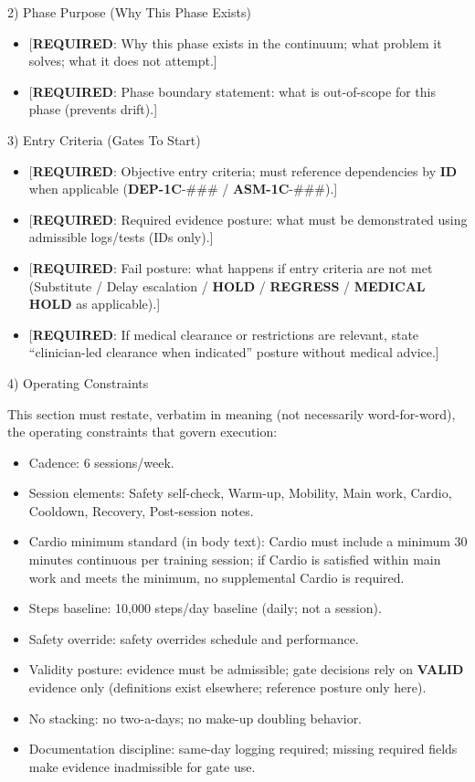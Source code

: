 \documentclass[10pt]{article}
\begin{document}
2) Phase Purpose (Why This Phase Exists)

\begin{itemize}
\item {[\textbf{REQUIRED}: Why this phase exists in the continuum; what problem it solves; what it does not attempt.]}
\item {[\textbf{REQUIRED}: Phase boundary statement: what is out-of-scope for this phase (prevents drift).]}
\end{itemize}

3) Entry Criteria (Gates To Start)

\begin{itemize}
\item {[\textbf{REQUIRED}: Objective entry criteria; must reference dependencies by \textbf{ID} when applicable (\textbf{DEP-1C}-\#\#\# / \textbf{ASM-1C}-\#\#\#).]}
\item {[\textbf{REQUIRED}: Required evidence posture: what must be demonstrated using admissible logs/tests (IDs only).]}
\item {[\textbf{REQUIRED}: Fail posture: what happens if entry criteria are not met (Substitute / Delay escalation / \textbf{HOLD} / \textbf{REGRESS} / \textbf{MEDICAL} \textbf{HOLD} as applicable).]}
\item {[\textbf{REQUIRED}: If medical clearance or restrictions are relevant, state “clinician-led clearance when indicated” posture without medical advice.]}
\end{itemize}

4) Operating Constraints

This section must restate, verbatim in meaning (not necessarily word-for-word), the operating constraints that govern execution:

\begin{itemize}
\item Cadence: 6 sessions/week.
\item Session elements: Safety self-check, Warm-up, Mobility, Main work, Cardio, Cooldown, Recovery, Post-session notes.
\item Cardio minimum standard (in body text): Cardio must include a minimum 30 minutes continuous per training session; if Cardio is satisfied within main work and meets the minimum, no supplemental Cardio is required.
\item Steps baseline: 10,000 steps/day baseline (daily; not a session).
\item Safety override: safety overrides schedule and performance.
\item Validity posture: evidence must be admissible; gate decisions rely on \textbf{VALID} evidence only (definitions exist elsewhere; reference posture only here).
\item No stacking: no two-a-days; no make-up doubling behavior.
\item Documentation discipline: same-day logging required; missing required fields make evidence inadmissible for gate use.
\end{itemize}
\end{document}
